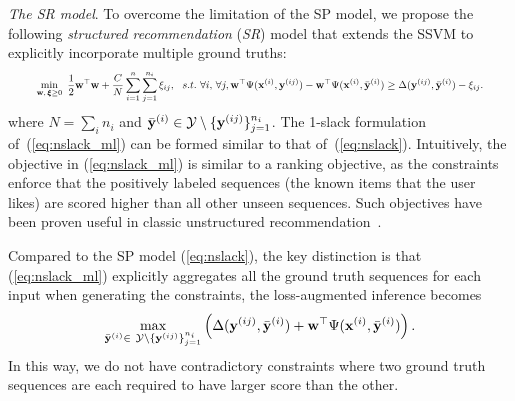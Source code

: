 \emph{The SR model}.
To overcome the limitation of the SP model,
we propose the following \emph{structured recommendation} (\emph{SR}) model that extends the SSVM to explicitly incorporate multiple ground truths: %
\begin{equation}
\label{eq:nslack_ml}
\resizebox{0.93\linewidth}{!}{$
\begin{aligned}
\min_{\w, \, \bm{\xi} \ge 0} ~ \frac{1}{2} \w^\top \w + \frac{C}{N} \sum_{i=1}^n \sum_{j=1}^{n_i} \xi_{ij}, ~~s.t.~ \forall i, \, \forall j, 
  \w^\top \Psi(\x^{(i)}, \y^{(ij)}) - \w^\top \Psi(\x^{(i)}, \bar{\y}^{(i)}) \ge
  \Delta(\y^{(ij)}, \bar{\y}^{(i)}) - \xi_{ij}.
\end{aligned}
$}
\end{equation}
where $N = \sum_i n_i$ and $\bar{\mathbf{y}}^{(i)} \in \mathcal{Y} \setminus \{\mathbf{y}^{(ij)}\}_{j=1}^{n_i}$.
The 1-slack formulation of~(\ref{eq:nslack_ml}) can be formed similar to that of~(\ref{eq:nslack}).
Intuitively, the objective in (\ref{eq:nslack_ml}) is similar to a ranking objective, as the constraints enforce
that the positively labeled sequences (the known items that the user likes) are scored
higher than all other unseen sequences.
Such objectives have been proven useful in classic unstructured recommendation~\cite{bpr09}.

Compared to the SP model (\ref{eq:nslack}), the key distinction is that (\ref{eq:nslack_ml})
explicitly aggregates all the ground truth sequences for each input when generating the constraints,
\ie the loss-augmented inference becomes
\begin{equation}
\label{eq:loss_aug_inf}
\max_{\bar{\mathbf{y}}^{(i)} \in \ \mathcal{Y} \setminus \{\mathbf{y}^{(ij)}\}_{j=1}^{n_i}}
     \left( \Delta(\mathbf{y}^{(ij)}, \bar{\mathbf{y}}^{(i)}) + \mathbf{w}^\top \Psi(\mathbf{x}^{(i)}, \bar{\mathbf{y}}^{(i)}) \right).
\end{equation}
In this way, we do not have contradictory constraints where
two ground truth sequences are each required to have larger score than the other.


